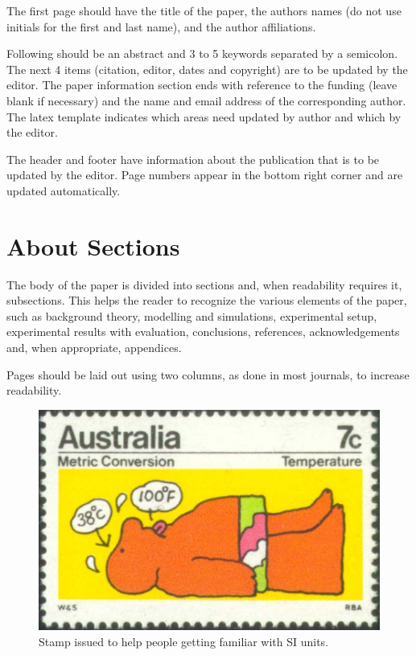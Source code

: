 \documentclass[10pt]{imeko_acta}
\begin{document}
The first page should have the title of the paper, the authors names (do not use initials for the first and last name), and the author affiliations.

Following should be an abstract and 3 to 5 keywords separated by a semicolon. The next 4 items (citation, editor, dates and copyright) are to be updated by the editor. The paper information section ends with reference to the funding (leave blank if necessary) and the name and email address of the corresponding author. The latex template indicates which areas need updated by author and which by the editor. 

The header and footer have information about the publication that is to be updated by the editor. Page numbers appear in the bottom right corner and are updated automatically.

\section{About Sections}

The body of the paper is divided into sections and, when readability requires it, subsections. This helps the reader to recognize the various elements of the paper, such as background theory, modelling and simulations, experimental setup, experimental results with evaluation, conclusions, references, acknowledgements and, when appropriate, appendices. 

Pages should be laid out using two columns, as done in most journals, to increase readability.

\begin{figure}
	\centering
	\includegraphics[width=0.7\linewidth]{image1}
	\vspace*{6pt}
	\caption{Stamp issued to help people getting familiar with SI units.}
	\label{fig:image1}
\end{figure}

	
\end{document}
